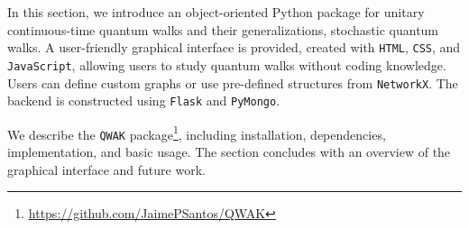 \documentclass[main.tex]{subfiles}
\begin{document}
In this section, we introduce an object-oriented Python package for unitary
continuous-time quantum walks and their generalizations, stochastic quantum
walks. A user-friendly graphical interface is provided, created with
\texttt{HTML}, \texttt{CSS}, and \texttt{JavaScript}, allowing users to study
quantum walks without coding knowledge. Users can define custom graphs or use
pre-defined structures from \texttt{NetworkX}. The backend is constructed using
\texttt{Flask} and \texttt{PyMongo}.\par

We describe the \texttt{QWAK}
package\footnote{\url{https://github.com/JaimePSantos/QWAK}}, including
installation, dependencies, implementation, and basic usage. The section
concludes with an overview of the graphical interface and future work.
\end{document}
